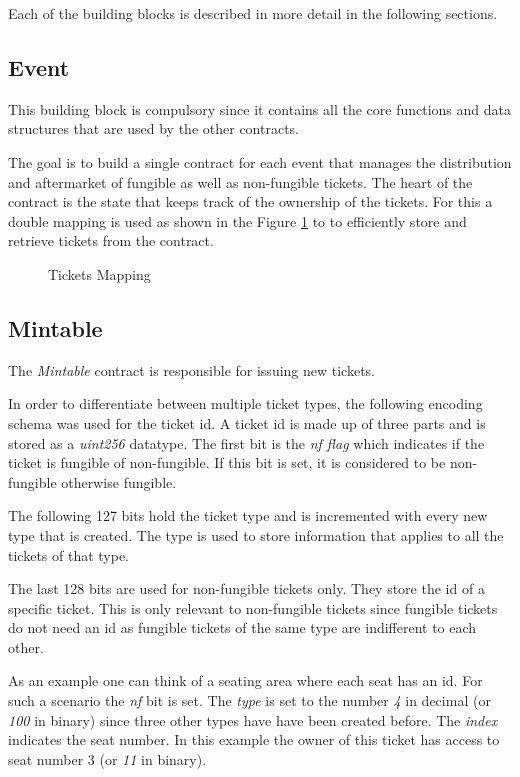 Each of the building blocks is described in more detail in the following sections.

\subsection{Event}
This building block is compulsory since it contains all the core functions and data structures that are used by the other contracts. 

The goal is to build a single contract for each event that manages the distribution and aftermarket of fungible as well as non-fungible tickets. The heart of the contract is the state that keeps track of the ownership of the tickets. For this a double mapping is used as shown in the Figure \ref{code:tickets} to to efficiently store and retrieve tickets from the contract.

\begin{figure}[H]
    
    \caption{Tickets Mapping}
    \label{code:tickets}
\end{figure}


\subsection{Mintable}\label{sec:tickets}
The \textit{Mintable} contract is responsible for issuing new tickets. 

In order to differentiate between multiple ticket types, the following encoding schema was used for the ticket id. A ticket id is made up of three parts and is stored as a \textit{uint256} datatype. The first bit is the \textit{nf flag} which indicates if the ticket is fungible of non-fungible. If this bit is set, it is considered to be non-fungible otherwise fungible. 

The following 127 bits hold the ticket type and is incremented with every new type that is created. The type is used to store information that applies to all the tickets of that type. 

The last 128 bits are used for non-fungible tickets only. They store the id of a specific ticket. This is only relevant to non-fungible tickets since fungible tickets do not need an id as fungible tickets of the same type are indifferent to each other. 

As an example one can think of a seating area where each seat has an id. For such a scenario the \textit{nf} bit is set. The \textit{type} is set to the number \textit{4} in decimal (or \textit{100} in binary) since three other types have have been created before. The \textit{index} indicates the seat number. In this example the owner of this ticket has access to seat number 3 (or \textit{11} in binary).

